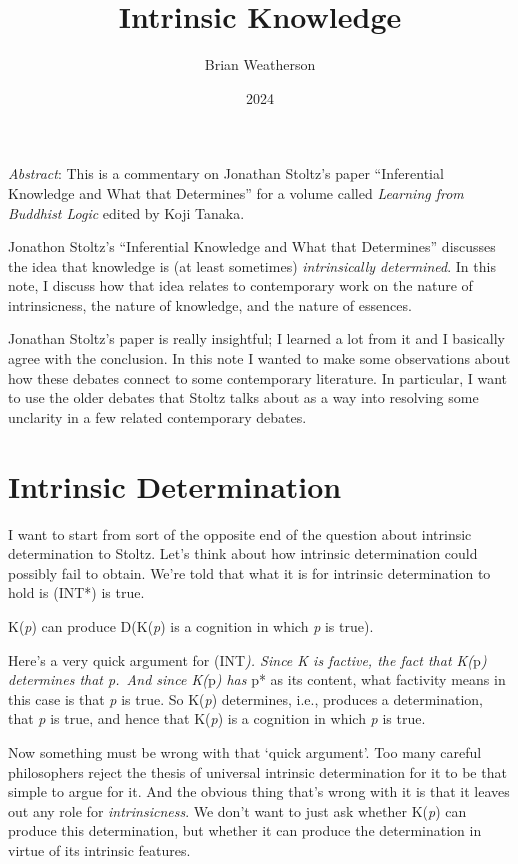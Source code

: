 \documentclass[
  11pt,
  letterpaper,
  DIV=11,
  numbers=noendperiod,
  twoside]{scrartcl}
\title{Intrinsic Knowledge}
\author{Brian Weatherson}
\date{2024}
\providecommand{\tightlist}{%
  \setlength{\itemsep}{0pt}\setlength{\parskip}{0pt}}\usepackage{longtable,booktabs,array}
\renewenvironment{abstract}
 {\vspace{-1.25cm}
 \quotation\small\noindent\emph{Abstract}:}
 {\endquotation}
\begin{document}
\maketitle
\begin{abstract}
This is a commentary on Jonathan Stoltz's paper ``Inferential Knowledge
and What that Determines'' for a volume called \emph{Learning from
Buddhist Logic} edited by Koji Tanaka.

Jonathon Stoltz's ``Inferential Knowledge and What that Determines''
discusses the idea that knowledge is (at least sometimes)
\emph{intrinsically determined}. In this note, I discuss how that idea
relates to contemporary work on the nature of intrinsicness, the nature
of knowledge, and the nature of essences.
\end{abstract}


Jonathan Stoltz's paper is really insightful; I learned a lot from it
and I basically agree with the conclusion. In this note I wanted to make
some observations about how these debates connect to some contemporary
literature. In particular, I want to use the older debates that Stoltz
talks about as a way into resolving some unclarity in a few related
contemporary debates.

\section{Intrinsic Determination}\label{sec-intrinsic-determination}

I want to start from sort of the opposite end of the question about
intrinsic determination to Stoltz. Let's think about how intrinsic
determination could possibly fail to obtain. We're told that what it is
for intrinsic determination to hold is (INT*) is true.

\begin{description}
\tightlist
\item[(INT*)]
K(\emph{p}) can produce D(K(\emph{p}) is a cognition in which \emph{p}
is true).
\end{description}

Here's a very quick argument for (INT\emph{). Since K is factive, the
fact that K(}p\emph{) determines that p.~And since K(}p\emph{) has }p*
as its content, what factivity means in this case is that \emph{p} is
true. So K(\emph{p}) determines, i.e., produces a determination, that
\emph{p} is true, and hence that K(\emph{p}) is a cognition in which
\emph{p} is true.

Now something must be wrong with that `quick argument'. Too many careful
philosophers reject the thesis of universal intrinsic determination for
it to be that simple to argue for it. And the obvious thing that's wrong
with it is that it leaves out any role for \emph{intrinsicness}. We
don't want to just ask whether K(\emph{p}) can produce this
determination, but whether it can produce the determination in virtue of
its intrinsic features.
\end{document}
